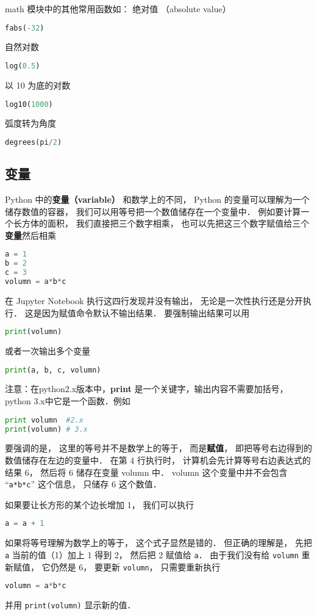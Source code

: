 math 模块中的其他常用函数如： 绝对值 （absolute value）
\begin{lstlisting}[language=python]
fabs(-32)
\end{lstlisting}
自然对数
\begin{lstlisting}[language=python]
log(0.5)
\end{lstlisting}
以 10 为底的对数
\begin{lstlisting}[language=python]
log10(1000)
\end{lstlisting}
弧度转为角度
\begin{lstlisting}[language=python]
degrees(pi/2)
\end{lstlisting}

\subsection{变量}
Python 中的\textbf{变量（variable）} 和数学上的不同， Python 的变量可以理解为一个储存数值的容器， 我们可以用等号把一个数值储存在一个变量中． 例如要计算一个长方体的面积， 我们直接把三个数字相乘， 也可以先把这三个数字赋值给三个\textbf{变量}然后相乘
\begin{lstlisting}[language=python]
a = 1
b = 2
c = 3
volumn = a*b*c
\end{lstlisting}
在 Jupyter Notebook 执行这四行发现并没有输出， 无论是一次性执行还是分开执行． 这是因为赋值命令默认不输出结果． 要强制输出结果可以用
\begin{lstlisting}[language=python]
print(volumn)
\end{lstlisting}
或者一次输出多个变量
\begin{lstlisting}[language=python]
print(a, b, c, volumn)
\end{lstlisting}
注意：在python2.x版本中，\textbf{print} 是一个关键字，输出内容不需要加括号，python 3.x中它是一个函数．例如
\begin{lstlisting}[language=python]
print volumn  #2.x
print(volumn) # 3.x
\end{lstlisting}
要强调的是， 这里的等号并不是数学上的等于， 而是\textbf{赋值}， 即把等号右边得到的数值储存在左边的变量中． 在第 4 行执行时， 计算机会先计算等号右边表达式的结果 6， 然后将 6 储存在变量 volumn 中． volumn 这个变量中并不会包含 “\verb|a*b*c|” 这个信息， 只储存 6 这个数值．

如果要让长方形的某个边长增加 1， 我们可以执行
\begin{lstlisting}[language=python]
a = a + 1
\end{lstlisting}
如果将等号理解为数学上的等于， 这个式子显然是错的． 但正确的理解是， 先把 \verb|a| 当前的值（1）加上 1 得到 2， 然后把 2 赋值给 \verb|a|． 由于我们没有给 \verb|volumn| 重新赋值， 它仍然是 6， 要更新 \verb|volumn|， 只需要重新执行
\begin{lstlisting}[language=python]
volumn = a*b*c
\end{lstlisting}
并用 \verb|print(volumn)| 显示新的值．

